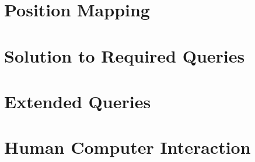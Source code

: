\documentclass[final,1p,times]{elsarticle}
\begin{document}
\section{Position Mapping}


\section{Solution to Required Queries}


\section{Extended Queries}


\section{Human Computer Interaction}
















\end{document}
